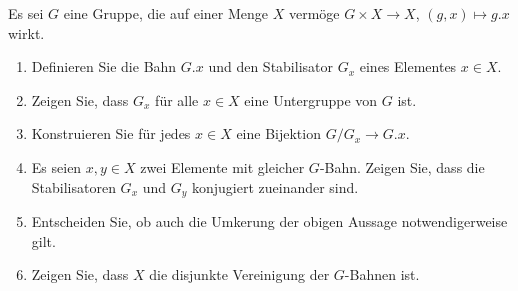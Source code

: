 \begin{question}[subtitle = Grundbegriffe der Gruppenwirkungen]
  Es sei $G$ eine Gruppe, die auf einer Menge $X$ vermöge $G \times X \to X$, $(g,x) \mapsto g.x$ wirkt.
  \begin{enumerate}
    \item
      Definieren Sie die Bahn $G.x$ und den Stabilisator $G_x$ eines Elementes $x \in X$.
    \item
      Zeigen Sie, dass $G_x$ für alle $x \in X$ eine Untergruppe von $G$ ist.
    \item
      Konstruieren Sie für jedes $x \in X$ eine Bijektion $G/G_x \to G.x$.
    \item
      Es seien $x, y \in X$ zwei Elemente mit gleicher $G$-Bahn.
      Zeigen Sie, dass die Stabilisatoren $G_x$ und $G_y$ konjugiert zueinander sind.
    \item
      Entscheiden Sie, ob auch die Umkerung der obigen Aussage notwendigerweise gilt.
    \item
      Zeigen Sie, dass $X$ die disjunkte Vereinigung der $G$-Bahnen ist.
  \end{enumerate}
\end{question}


